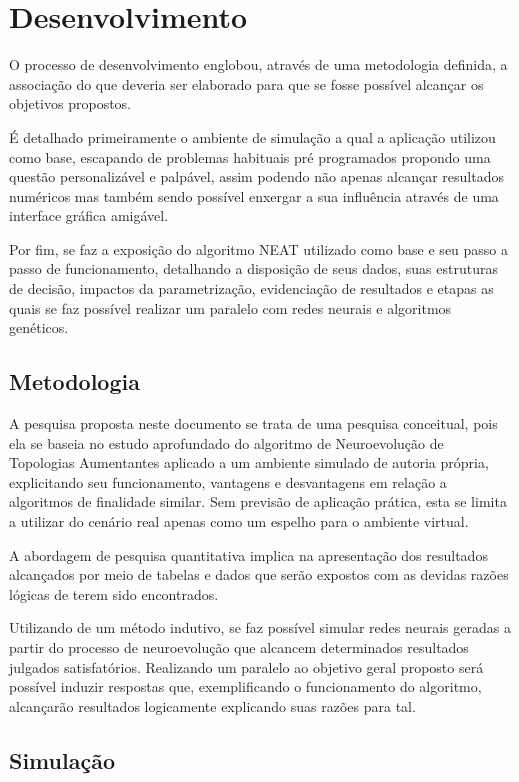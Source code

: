 \chapter{Desenvolvimento}
O processo de desenvolvimento englobou, através de uma metodologia definida,
a associação do que deveria ser elaborado para que se fosse possível alcançar
os objetivos propostos.

É detalhado primeiramente o ambiente de simulação a qual a aplicação utilizou como base,
escapando de problemas habituais pré programados propondo uma questão personalizável e
palpável, assim podendo não apenas alcançar resultados numéricos mas também sendo possível
enxergar a sua influência através de uma interface gráfica amigável.

Por fim, se faz a exposição do algoritmo NEAT utilizado como base e seu passo a passo
de funcionamento, detalhando a disposição de seus dados, suas estruturas de decisão, 
impactos da parametrização, evidenciação de resultados e etapas as quais se faz possível 
realizar um paralelo com redes neurais e algoritmos genéticos.

\section{Metodologia}

A pesquisa proposta neste documento se trata de uma pesquisa conceitual, pois ela se
baseia no estudo aprofundado do algoritmo de Neuroevolução de Topologias Aumentantes
aplicado a um ambiente simulado de autoria própria, explicitando seu funcionamento,
vantagens e desvantagens em relação a algoritmos de finalidade similar. Sem previsão de
aplicação prática, esta se limita a utilizar do cenário real apenas como um espelho para
o ambiente virtual.

A abordagem de pesquisa quantitativa implica na apresentação dos resultados alcançados
por meio de tabelas e dados que serão expostos com as devidas razões lógicas de terem
sido encontrados.

Utilizando de um método indutivo, se faz possível simular redes neurais geradas a
partir do processo de neuroevolução que alcancem determinados resultados julgados
satisfatórios. Realizando um paralelo ao objetivo geral proposto será possível induzir
respostas que, exemplificando o funcionamento do algoritmo, alcançarão resultados
logicamente explicando suas razões para tal.

\section{Simula{\c c}{\~a}o}

